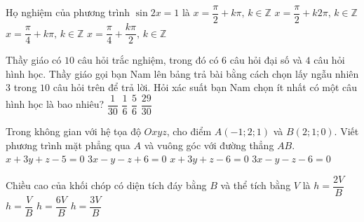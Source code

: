 \begin{ex}%
Họ nghiệm của phương trình $\sin2x=1$ là
\choice
{$x=\dfrac{\pi}{2}+k\pi,\,k\in\mathbb{Z}$}
{$x=\dfrac{\pi}{2}+k2\pi,\,k\in\mathbb{Z}$}
{\True $x=\dfrac{\pi}{4}+k\pi,\,k\in\mathbb{Z}$}
{$x=\dfrac{\pi}{4}+\dfrac{k\pi}{2},\,k\in\mathbb{Z}$}
\end{ex} 
\begin{ex}%
Thầy giáo có $10$ câu hỏi trắc nghiệm, trong đó có $6$ câu hỏi đại số và $4$ câu hỏi hình học. Thầy giáo gọi bạn Nam lên bảng trả bài bằng cách chọn lấy ngẫu nhiên $3$ trong $10$ câu hỏi trên để trả lời. Hỏi xác suất bạn Nam chọn ít nhất có một câu hình học là bao nhiêu?
\choice
{$\dfrac{1}{30}$}
{$\dfrac{1}{6}$}
{\True $\dfrac{5}{6}$}
{$\dfrac{29}{30}$}
\end{ex}

\begin{ex}%
Trong không gian với hệ tọa độ $Oxyz$, cho điểm $A(-1;2;1)$ và $B(2;1;0)$. Viết phương trình mặt phẳng qua $A$ và vuông góc với đường thẳng $AB$.
\choice
{$x+3y+z-5=0$}
{\True $3x-y-z+6=0$}
{$x+3y+z-6=0$}
{$3x-y-z-6=0$}
\end{ex}

\begin{ex}%
Chiều cao của khối chóp có diện tích đáy bằng $B$ và thể tích bằng $V$ là
\choice
{$h=\dfrac{2V}{B}$}
{$h=\dfrac{V}{B}$}
{$h=\dfrac{6V}{B}$}
{\True $h=\dfrac{3V}{B}$}
\end{ex}

